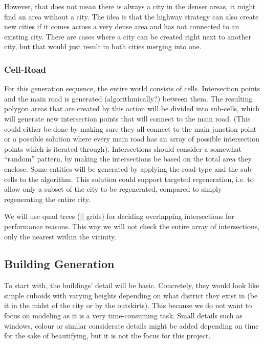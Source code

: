 However, that does not mean there is always a city in the denser areas, it might find an area without a city. The idea is that the highway strategy can also create new cities if it comes across
a very dense area and has not connected to an existing city. There are cases where a city can be created right next to another city, but that would just result in both cities merging into one.


\subsubsection{Cell-Road}
For this generation sequence, the entire world consists of cells.
Intersection points and the main road is generated (algorithmically?) between them.
The resulting polygon areas that are created by this action will be divided into sub-cells, which will generate new intersection points that will connect to the main road. (This could either be done by making sure they all connect to the main junction point or a possible solution where every main road has an array of possible intersection points which is iterated through).
Intersections should consider a somewhat “random” pattern, by making the intersections be based on the total area they enclose.
Some entities will be generated by applying the road-type and the sub-cells to the algorithm.
This solution could support targeted regeneration, i.e. to allow only a subset of the city to be regenerated, compared to simply regenerating the entire city.

We will use quad trees (|| grids) for deciding overlapping intersections for performance reasons.
This way we will not check the entire array of intersections, only the nearest within the vicinity.

\subsection{Building Generation}
To start with, the buildings’ detail will be basic.
Concretely, they would look like simple cuboids with varying heights depending on what district they exist in (be it in the midst of the city or by the outskirts).
This because we do not want to focus on modeling as it is a very time-consuming task.
Small details such as windows, colour or similar considerate details might be added depending on time for the sake of beautifying, but it is not the focus for this project.
